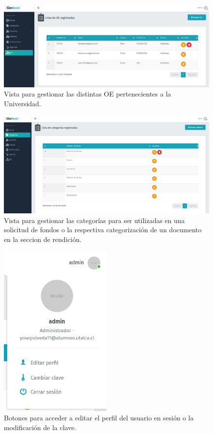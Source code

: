 \begin{figure}[h]
    \centering
    \includegraphics[width=1\textwidth]{Imagenes/CRUDOE.PNG}
    \caption{\label{fig: CRUDOE}Vista para gestionar las distintas OE pertenecientes a la Universidad.}
\end{figure}

\begin{figure}[h]
    \centering
    \includegraphics[width=1\textwidth]{Imagenes/CRUDCategoria.PNG}
    \caption{\label{fig: CRUDCategoria}Vista para gestionar las categorías para ser utilizadas en una solicitud de fondos o la respectiva categorización de un documento en la seccion de rendición.}
\end{figure}

\begin{figure}[h]
    \centering
    \includegraphics[width=0.5\textwidth]{Imagenes/EditarPerfilClave.PNG}
    \caption{\label{fig: EditarPerfilClave}Botones para acceder a editar el perfil del usuario en sesión o la modificación de la clave.}
\end{figure}

